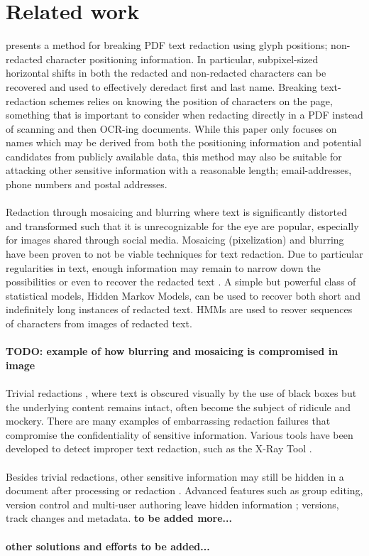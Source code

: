 \chapter{Related work}

\cite{bland2022story} presents a method for breaking PDF text redaction using glyph positions; non-redacted character positioning information. In particular, subpixel-sized horizontal shifts in both the redacted and non-redacted characters can be recovered and used to effectively deredact first and last name. Breaking text-redaction schemes relies on knowing the position of characters on the page, something that is important to consider when redacting directly in a PDF instead of scanning and then OCR-ing documents. While this paper only focuses on names which may be derived from both the positioning information and potential candidates from publicly available data, this method may also be suitable for attacking other sensitive information with a reasonable length; email-addresses, phone numbers and postal addresses.
\\\\
Redaction through mosaicing and blurring where text is significantly distorted and transformed such that it is unrecognizable for the eye are popular, especially for images shared through social media. Mosaicing (pixelization) and blurring have been proven to not be viable techniques for text redaction. Due to particular regularities in text, enough information may remain to narrow down the possibilities or even to recover the redacted text \cite{hill2016effectiveness}. A simple but powerful class of statistical models, Hidden Markov Models, can be used to recover both short and indefinitely long instances of redacted text. HMMs are used to reover sequences of characters from images of redacted text. 
\\\\
\textbf{TODO: example of how blurring and mosaicing is compromised in image}
\\\\
Trivial redactions \cite{forrester2005investigation}, where text is obscured visually by the use of black boxes but the underlying content remains intact, often become the subject of ridicule and mockery. There are many examples of embarrassing redaction failures \cite{failures2019} that compromise the confidentiality of  sensitive information. Various tools have been developed to detect improper text redaction, such as the X-Ray Tool \cite{Xray2021}.
\\\\
Besides trivial redactions, other sensitive information may still be hidden in a document after processing or redaction \cite{muller2021processing}. Advanced features such as group editing, version control and multi-user authoring leave hidden information \cite{forrester2005investigation}; versions, track changes and metadata. \textbf{to be added more...}
\\\\
\textbf{other solutions and efforts to be added...}
